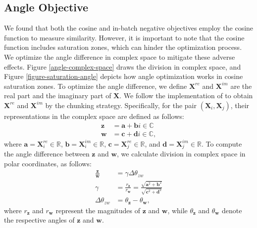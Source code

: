 \documentclass{article} \usepackage{iclr2024_conference,times}
\begin{document}
\subsection{Angle Objective}
We found that both the cosine and in-batch negative objectives employ the cosine function to measure similarity. However, it is important to note that the cosine function includes saturation zones, which can hinder the optimization process. We optimize the angle difference in complex space to mitigate these adverse effects. Figure \ref{angle-complex-space} draws the division in complex space, and Figure \ref{figure-saturation-angle} depicts how angle optimization works in cosine saturation zones. To optimize the angle difference, we define $\mathbf{X}^{re}$ and $\mathbf{X}^{im}$ are the real part and the imaginary part of $\mathbf{X}$. We follow the implementation of \citep{sun2019rotate} to obtain $\mathbf{X}^{re}$ and $\mathbf{X}^{im}$ by the chunking strategy. Specifically, for the pair $(\mathbf{X}_i, \mathbf{X}_j)$, their representations in the complex space are defined as follows:
\begin{equation}
    \begin{split}
    \mathbf{z} & = \mathbf{a} + \mathbf{b}i \in \mathbb{C} \\
    \mathbf{w} & = \mathbf{c} + \mathbf{d}i \in \mathbb{C},
    \end{split}
\end{equation}
where $\mathbf{a} = \mathbf{X}^{re}_i \in \mathbb{R}$, $\mathbf{b} = \mathbf{X}^{im}_i \in \mathbb{R}$, $\mathbf{c} = \mathbf{X}^{re}_j \in \mathbb{R}$, and  $\mathbf{d} = \mathbf{X}^{im}_j \in \mathbb{R}$.
To compute the angle difference between $\mathbf{z}$ and $\mathbf{w}$, we calculate division in complex space in polar coordinates, as follows:
\begin{equation}
    \begin{split}
        \frac{\mathbf{z}}{\mathbf{w}} &= \gamma \Delta \theta_{zw} \\
        \gamma &= \frac{r_{\mathbf{z}}}{r_{\mathbf{w}}} = \frac{\sqrt{\mathbf{a}^2 + \mathbf{b}^2}}{\sqrt{\mathbf{c}^2 + \mathbf{d}^2}} \\
        \Delta \theta_{zw} &= \theta_{\mathbf{z}} - \theta_{\mathbf{w}},
    \end{split}
    \label{division-complex-1}
\end{equation}
where $r_\mathbf{z}$ and $r_\mathbf{w}$ represent the magnitudes of $\mathbf{z}$ and $\mathbf{w}$, while $\theta_\mathbf{z}$ and $\theta_\mathbf{w}$ denote the respective angles of $\mathbf{z}$ and $\mathbf{w}$. 
\end{document}
